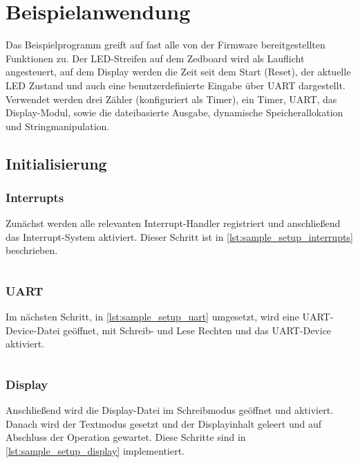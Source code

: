 \chapter{Beispielanwendung}
\label{cha:sample_application}

Das Beispielprogramm greift auf fast alle von der Firmware bereitgestellten Funktionen zu. Der LED-Streifen auf dem Zedboard wird als Lauflicht angesteuert, auf dem Display werden die Zeit seit dem Start (Reset), der aktuelle LED Zustand und auch eine benutzerdefinierte Eingabe über UART dargestellt.
Verwendet werden drei Zähler (konfiguriert als Timer), ein Timer, UART, das Display-Modul, sowie die dateibasierte Ausgabe, dynamische Speicherallokation und Stringmanipulation.
\section{Initialisierung}

\subsection{Interrupts}

Zunächst werden alle relevanten Interrupt-Handler registriert und anschließend das Interrupt-System aktiviert. Dieser Schritt ist in \cref{lst:sample_setup_interrupts} beschrieben.

\begin{code}
	\inputminted[autogobble, firstline=43, lastline=53, firstnumber=43]{C}{attachments/Plasma-SoC/sw/examples/src/sample.c}
	\caption{Interrupt Setup}
	\label{lst:sample_setup_interrupts}
\end{code}

\subsection{UART}
Im nächsten Schritt, in \cref{lst:sample_setup_uart} umgesetzt, wird eine UART-Device-Datei geöffnet, mit Schreib- und Lese Rechten und das UART-Device aktiviert. 

\begin{code}
	\inputminted[autogobble, firstline=55, lastline=59, firstnumber=55]{C}{attachments/Plasma-SoC/sw/examples/src/sample.c}
	\caption{UART Setup}
	\label{lst:sample_setup_uart}
\end{code}

\subsection{Display}
Anschließend wird die Display-Datei im Schreibmodus geöffnet und aktiviert. Danach wird der Textmodus gesetzt und der Displayinhalt geleert und auf Abschluss der Operation gewartet. Diese Schritte sind in \cref{lst:sample_setup_display} implementiert.

